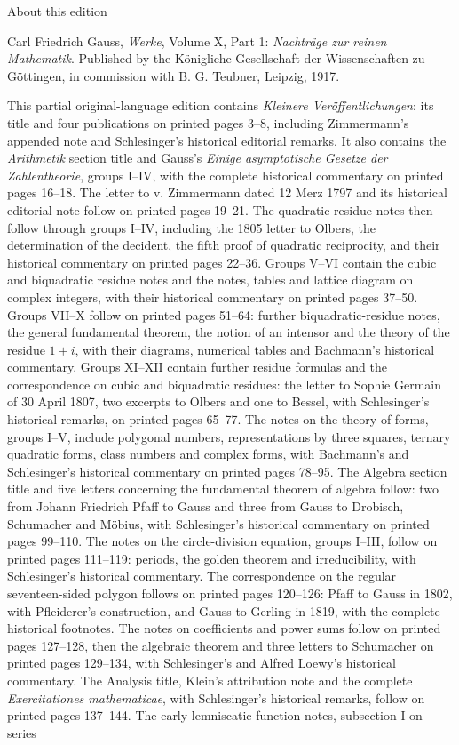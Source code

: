 \clearpage
\NoSourceHead{}
\begin{center}\Large About this edition\end{center}
\noindent Carl Friedrich Gauss, \textit{Werke}, Volume X, Part 1: \textit{Nachträge zur reinen Mathematik}. Published by the Königliche Gesellschaft der Wissenschaften zu Göttingen, in commission with B. G. Teubner, Leipzig, 1917.

This partial original-language edition contains \textit{Kleinere Veröffentlichungen}: its title and four publications on printed pages 3–8, including Zimmermann's appended note and Schlesinger's historical editorial remarks. It also contains the \textit{Arithmetik} section title and Gauss's \textit{Einige asymptotische Gesetze der Zahlentheorie}, groups I–IV, with the complete historical commentary on printed pages 16–18. The letter to v. Zimmermann dated 12 Merz 1797 and its historical editorial note follow on printed pages 19–21. The quadratic-residue notes then follow through groups I–IV, including the 1805 letter to Olbers, the determination of the decident, the fifth proof of quadratic reciprocity, and their historical commentary on printed pages 22–36. Groups V–VI contain the cubic and biquadratic residue notes and the notes, tables and lattice diagram on complex integers, with their historical commentary on printed pages 37–50. Groups VII–X follow on printed pages 51–64: further biquadratic-residue notes, the general fundamental theorem, the notion of an intensor and the theory of the residue $1+i$, with their diagrams, numerical tables and Bachmann’s historical commentary. Groups XI–XII contain further residue formulas and the correspondence on cubic and biquadratic residues: the letter to Sophie Germain of 30 April 1807, two excerpts to Olbers and one to Bessel, with Schlesinger’s historical remarks, on printed pages 65–77. The notes on the theory of forms, groups I–V, include polygonal numbers, representations by three squares, ternary quadratic forms, class numbers and complex forms, with Bachmann’s and Schlesinger’s historical commentary on printed pages 78–95. The Algebra section title and five letters concerning the fundamental theorem of algebra follow: two from Johann Friedrich Pfaff to Gauss and three from Gauss to Drobisch, Schumacher and Möbius, with Schlesinger’s historical commentary on printed pages 99–110. The notes on the circle-division equation, groups I–III, follow on printed pages 111–119: periods, the golden theorem and irreducibility, with Schlesinger’s historical commentary. The correspondence on the regular seventeen-sided polygon follows on printed pages 120–126: Pfaff to Gauss in 1802, with Pfleiderer’s construction, and Gauss to Gerling in 1819, with the complete historical footnotes. The notes on coefficients and power sums follow on printed pages 127–128, then the algebraic theorem and three letters to Schumacher on printed pages 129–134, with Schlesinger’s and Alfred Loewy’s historical commentary. The Analysis title, Klein’s attribution note and the complete \textit{Exercitationes mathematicae}, with Schlesinger’s historical remarks, follow on printed pages 137–144. The early lemniscatic-function notes, subsection I on series 